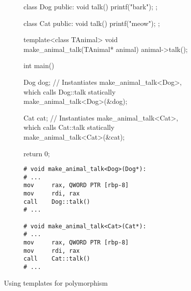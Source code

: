 \begin{figure}
    \centering
    \begin{subfigure}{0.49\linewidth}%
        \begin{cppcode}
class Dog {
public:
    void talk() {
        printf("bark\n");
    }
};

class Cat {
public:
    void talk() {
        printf("meow\n");
    }
};

template<class TAnimal>
void make_animal_talk(TAnimal* animal) {
    animal->talk();
}

int main() {
    Dog dog{};
    // Instantiates make_animal_talk<Dog>, which calls Dog::talk statically
    make_animal_talk<Dog>(&dog);

    Cat cat{};
    // Instantiates make_animal_talk<Cat>, which calls Cat::talk statically
    make_animal_talk<Cat>(&cat);

    return 0;
}
        \end{cppcode}
    \end{subfigure}%
    \begin{subfigure}{0.49\linewidth}%
        \begin{verbatim}
# void make_animal_talk<Dog>(Dog*):
# ...
mov     rax, QWORD PTR [rbp-8]
mov     rdi, rax
call    Dog::talk()
# ...
        
# void make_animal_talk<Cat>(Cat*):
# ...
mov     rax, QWORD PTR [rbp-8]
mov     rdi, rax
call    Cat::talk()
# ...
        \end{verbatim}
    \end{subfigure}%
    \caption{Using templates for polymorphism}
    \label{fig:templated_polymorphism}
\end{figure}
